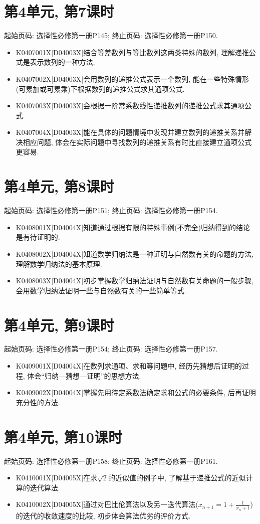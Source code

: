 \section*{第4单元, 第7课时}
起始页码: 选择性必修第一册P145; 终止页码: 选择性必修第一册P150.
\begin{itemize}
\item K0407001X|D04003X|结合等差数列与等比数列这两类特殊的数列, 理解递推公式是表示数列的一种方法.
\item K0407002X|D04003X|会用数列的递推公式表示一个数列, 能在一些特殊情形(可累加或可累乘)下根据数列的递推公式求其通项公式.
\item K0407003X|D04003X|会根据一阶常系数线性递推数列的递推公式求其通项公式.
\item K0407004X|D04003X|能在具体的问题情境中发现并建立数列的递推关系并解决相应问题, 体会在实际问题中寻找数列的递推关系有时比直接建立通项公式更容易.
\end{itemize}

\section*{第4单元, 第8课时}
起始页码: 选择性必修第一册P151; 终止页码: 选择性必修第一册P154.
\begin{itemize}
\item K0408001X|D04004X|知道通过根据有限的特殊事例(不完全)归纳得到的结论是有待证明的.
\item K0408002X|D04004X|知道数学归纳法是一种证明与自然数有关的命题的方法, 理解数学归纳法的基本原理.
\item K0408003X|D04004X|初步掌握数学归纳法证明与自然数有关命题的一般步骤, 会用数学归纳法证明一些与自然数有关的一些简单等式.
\end{itemize}

\section*{第4单元, 第9课时}
起始页码: 选择性必修第一册P154; 终止页码: 选择性必修第一册P157.
\begin{itemize}
\item K0409001X|D04004X|在数列求通项、求和等问题中, 经历先猜想后证明的过程, 体会``归纳—猜想—证明''的思想方法.
\item K0409002X|D04004X|掌握先用待定系数法确定求和公式的必要条件, 后再证明充分性的方法.
\end{itemize}

\section*{第4单元, 第10课时}
起始页码: 选择性必修第一册P158; 终止页码: 选择性必修第一册P161.
\begin{itemize}
\item K0410001X|D04005X|在求$\sqrt 2$的近似值的例子中, 了解基于递推公式的近似计算的迭代算法.
\item K0410002X|D04005X|通过对巴比伦算法以及另一迭代算法($x_{n+1}=1+\frac{1}{x_{n}+1}$)的迭代的收敛速度的比较, 初步体会算法优劣的评价方式.
\end{itemize}

